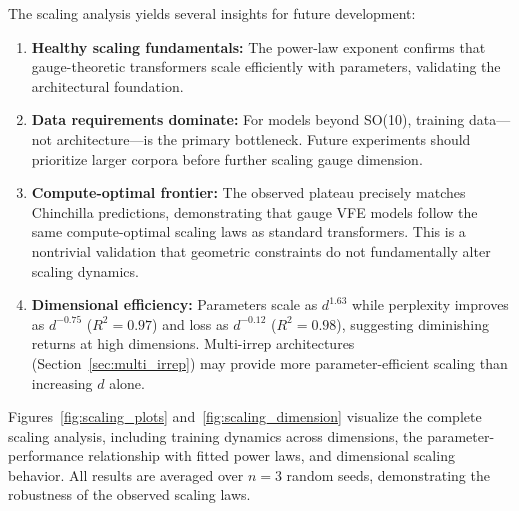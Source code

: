 \documentclass[twoside,11pt]{article}
\begin{document}
The scaling analysis yields several insights for future development:

\begin{enumerate}
    \item \textbf{Healthy scaling fundamentals:} The power-law exponent confirms that gauge-theoretic transformers scale efficiently with parameters, validating the architectural foundation.

    \item \textbf{Data requirements dominate:} For models beyond SO(10), training data---not architecture---is the primary bottleneck. Future experiments should prioritize larger corpora before further scaling gauge dimension.

    \item \textbf{Compute-optimal frontier:} The observed plateau precisely matches Chinchilla predictions, demonstrating that gauge VFE models follow the same compute-optimal scaling laws as standard transformers. This is a nontrivial validation that geometric constraints do not fundamentally alter scaling dynamics.

    \item \textbf{Dimensional efficiency:} Parameters scale as $d^{1.63}$ while perplexity improves as $d^{-0.75}$ ($R^2 = 0.97$) and loss as $d^{-0.12}$ ($R^2 = 0.98$), suggesting diminishing returns at high dimensions. Multi-irrep architectures (Section~\ref{sec:multi_irrep}) may provide more parameter-efficient scaling than increasing $d$ alone.
\end{enumerate}

Figures~\ref{fig:scaling_plots} and~\ref{fig:scaling_dimension} visualize the complete scaling analysis, including training dynamics across dimensions, the parameter-performance relationship with fitted power laws, and dimensional scaling behavior. All results are averaged over $n=3$ random seeds, demonstrating the robustness of the observed scaling laws.
\end{document}

